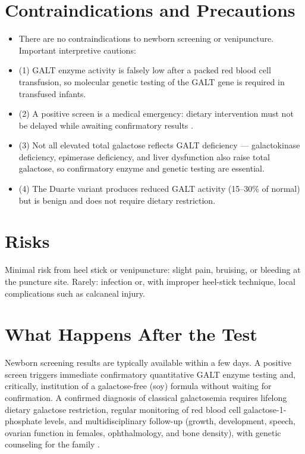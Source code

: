 \section*{Contraindications and Precautions}
\begin{itemize}
  \item There are no contraindications to newborn screening or venipuncture. Important interpretive cautions:
  \item (1) GALT enzyme activity is falsely low after a packed red blood cell transfusion, so molecular genetic testing of the GALT gene is required in transfused infants.
  \item (2) A positive screen is a medical emergency: dietary intervention must not be delayed while awaiting confirmatory results \cite{berry2012galactosemia}.
  \item (3) Not all elevated total galactose reflects GALT deficiency --- galactokinase deficiency, epimerase deficiency, and liver dysfunction also raise total galactose, so confirmatory enzyme and genetic testing are essential.
  \item (4) The Duarte variant produces reduced GALT activity (15--30\% of normal) but is benign and does not require dietary restriction.
\end{itemize}
\section*{Risks}
Minimal risk from heel stick or venipuncture: slight pain, bruising, or bleeding at the puncture site. Rarely: infection or, with improper heel-stick technique, local complications such as calcaneal injury.

\section*{What Happens After the Test}
Newborn screening results are typically available within a few days. A positive screen triggers immediate confirmatory quantitative GALT enzyme testing and, critically, institution of a galactose-free (soy) formula without waiting for confirmation. A confirmed diagnosis of classical galactosemia requires lifelong dietary galactose restriction, regular monitoring of red blood cell galactose-1-phosphate levels, and multidisciplinary follow-up (growth, development, speech, ovarian function in females, ophthalmology, and bone density), with genetic counseling for the family \cite{welling2017international}.

